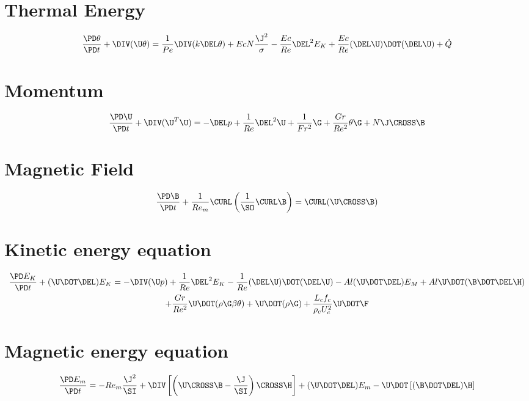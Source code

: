 \documentclass[landscape,11pt]{article}
\begin{document}
\doublespacing
\MOONSTITLE

\section{Thermal Energy}
\Large
\begin{equation}
	\frac{\PD \theta}{\PD t}
	+ \DIV (\U \theta)
	=
	\frac{1}{Pe} \DIV (k \DEL \theta)
	+ Ec N \frac{{\J}^2}{\sigma}
	- \frac{Ec}{Re} \DEL^2 E_K
	+ \frac{Ec}{Re} (\DEL \U) \DOT (\DEL \U)
	+ \dot{Q}
\end{equation}
\section{Momentum}
\begin{equation}
	\frac{\PD \U}{\PD t}
	+ \DIV (\U^T \U)
	=
	- \DEL p
	+ \frac{1}{Re} \DEL^2 \U
	+ \frac{1}{Fr^2} \G
	+ \frac{Gr}{Re^2} \theta \G
	+ N \J \CROSS \B
\end{equation}
\section{Magnetic Field}
\begin{equation}
	\frac{\PD \B}{\PD t}
	+ \frac{1}{Re_m} \CURL \left(\frac{1}{\SO} \CURL \B \right)
	= \CURL (\U \CROSS \B)
\end{equation}
\section{Kinetic energy equation}
\begin{multline}
	\frac{\PD E_K}{\PD t}
	+ (\U \DOT \DEL) E_K
	=
	- \DIV (\U p)
	+ \frac{1}{Re} \DEL^2 E_K
	- \frac{1}{Re} (\DEL \U) \DOT (\DEL \U)
	- Al (\U \DOT \DEL) E_M
	+ Al \U \DOT (\B \DOT \DEL \H) \\
	+ \frac{Gr}{Re^2} \U \DOT (\rho \G \beta \theta)
	+ \U \DOT (\rho \G)
	+ \frac{L_c f_c}{\rho_c U_c^2} \U \DOT \F
\end{multline}
\section{Magnetic energy equation}
\begin{equation}
	\frac{\PD E_m}{\PD t} =
	- Re_m \frac{{\J}^2}{\SI}
	+ \DIV \left[\left(\U \CROSS \B - \frac{\J}{\SI} \right) \CROSS \H \right]
	+ (\U \DOT \DEL) E_m
	- \U \DOT \left[(\B \DOT \DEL) \H \right]
\end{equation}
\end{document}
